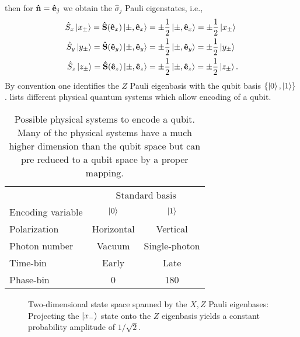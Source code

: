 then for $\vu{n}=\vu{e}_j$ we obtain the $\hat{\sigma}_j$ Pauli eigenstates, i.e.,
\begin{align}
	\hat{S}_x
	\ket{x_\pm}
	=	
	\vb{\hat{S}}(\vu{e}_x)
	\ket{\pm,\vu{e}_x}
	&=
	\pm\frac{1}{2}
	\ket{\pm,\vu{e}_x}
	=
	\pm\frac{1}{2}
	\ket{x_\pm}
	\\
	\hat{S}_y
	\ket{y_\pm}
	=	
	\vb{\hat{S}}(\vu{e}_y)
	\ket{\pm,\vu{e}_y}
	&=
	\pm\frac{1}{2}
	\ket{\pm,\vu{e}_y}
	=
	\pm\frac{1}{2}
	\ket{y_\pm}
	\\
	\hat{S}_z
	\ket{z_\pm}
	=	
	\vb{\hat{S}}(\vu{e}_z)
	\ket{\pm,\vu{e}_z}
	&=
	\pm\frac{1}{2}
	\ket{\pm,\vu{e}_z}
	=
	\pm\frac{1}{2}
	\ket{z_\pm}
	.
\end{align}
By convention one identifies the $Z$ Pauli eigenbasis with the qubit basis $\left\{\ket{0},\ket{1}\right\}$.
 lists different physical quantum systems  which allow encoding of a qubit.
\begin{table}[htb]
	\centering	
	\begin{tabular}{lcc}
		\toprule
		& \multicolumn{2}{c}{Standard basis} \\
		\cmidrule{2-3}
		Encoding variable & $\ket{0}$ & $\ket{1}$ \\
		\midrule
		Polarization & Horizontal & Vertical \\
		Photon number & Vacuum & Single-photon \\
		Time-bin & Early & Late \\
		Phase-bin & \SI{0}{\deg} & \SI{180}{\deg} \\
		\bottomrule
	\end{tabular}
	\caption{Possible physical systems to encode a qubit. Many of the physical systems have a much higher dimension than the qubit space but can pre reduced to a qubit space by a proper mapping.}\label{tab:qubit_encodings}
\end{table}
\begin{figure}[htb]
	\centering
	
	\caption{Two-dimensional state space spanned by the $X,Z$ Pauli eigenbases: Projecting the $\ket{x_-}$ state onto the $Z$ eigenbasis yields a constant probability amplitude of $1/\sqrt{2}$.}
\end{figure}

